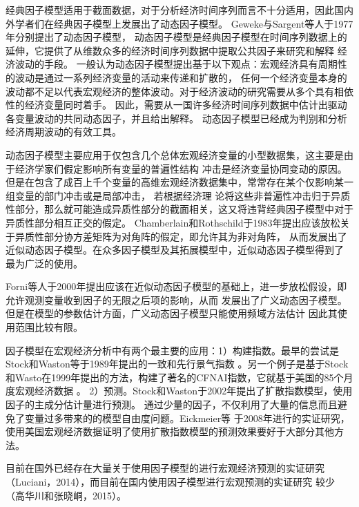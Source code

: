 经典因子模型适用于截面数据，对于分析经济时间序列而言不十分适用，因此国内外学者们在经典因子模型上发展出了动态因子模型。
Geweke\cite{geweke1977dynamic}与Sargent\cite{sargent1977business}等人于1977年分别提出了动态因子模型，
动态因子模型是经典因子模型在时间序列数据上的延伸，它提供了从维数众多的经济时间序列数据中提取公共因子来研究和解释
经济波动的手段。
一般认为动态因子模型提出基于以下观点：宏观经济具有周期性的波动是通过一系列经济变量的活动来传递和扩散的，
任何一个经济变量本身的波动都不足以代表宏观经济的整体波动。对于经济波动的研究需要从多个具有相依性的经济变量同时着手。
因此，需要从一国许多经济时间序列数据中估计出驱动各变量波动的共同动态因子，并且给出解释。
动态因子模型已经成为判别和分析经济周期波动的有效工具。

动态因子模型主要应用于仅包含几个总体宏观经济变量的小型数据集，这主要是由于经济学家们假定影响所有变量的普遍性结构
冲击是经济变量协同变动的原因。但是在包含了成百上千个变量的高维宏观经济数据集中，常常存在某个仅影响某一组变量的部门冲击或是局部冲击，
若根据经济理 论将这些非普遍性冲击归于异质性部分，那么就可能造成异质性部分的截面相关，这又将违背经典因子模型中对于异质性部分相互正交的假定。
Chamberlain和Rothschild于1983年提出应该放松关于异质性部分协方差矩阵为对角阵的假定，即允许其为非对角阵，
从而发展出了近似动态因子模型\cite{chamberlain1982arbitrage}。在众多因子模型及其拓展模型中，近似动态因子模型得到了
最为广泛的使用。

Forni等人于2000年提出应该在近似动态因子模型的基础上，进一步放松假设，即允许观测变量收到因子的无限之后项的影响，从而
发展出了广义动态因子模型\cite{forni2000generalized}。但是在模型的参数估计方面，广义动态因子模型只能使用频域方法估计
因此其使用范围比较有限。

因子模型在宏观经济分析中有两个最主要的应用：1）构建指数。最早的尝试是Stock和Waston等于1989年提出的一致和先行景气指数
\cite{stock1989new}。另一个例子是基于Stock和Wasto在1999年提出的方法\cite{chan1999dynamic}，构建了著名的CFNAI指数，它就基于美国的85个月度宏观经济数据
。
2）预测。Stock和Waston于2002年提出了扩散指数模型\cite{stock2002macroeconomic}，使用因子的主成分估计量进行预测。
通过少量的因子，不仅利用了大量的信息而且避免了变量过多带来的的模型自由度问题。Eickmeier等
于2008年进行的实证研究\cite{eickmeier2008successful}，使用美国宏观经济数据证明了使用扩散指数模型的预测效果要好于大部分其他方法。

目前在国外已经存在大量关于使用因子模型的进行宏观经济预测的实证研究（Luciani，2014\cite{luciani2014large}），而目前在国内使用因子模型进行宏观预测的实证研究
较少（高华川和张晓峒，2015\cite{高华川2015动态因子模型及其应用研究综述}）。

